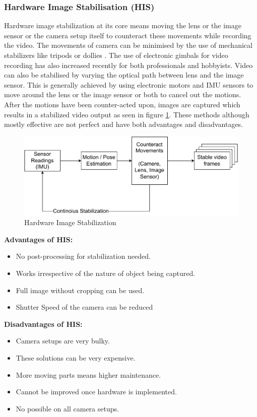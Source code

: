 \subsubsection{Hardware Image Stabilisation (HIS)}
Hardware image stabilization at its core means moving the lens or the image sensor or the camera setup itself to counteract these movements while recording the video. The movements of camera can be minimised by the use of mechanical stabilizers like tripods or dollies \citep{5995525}. The use of electronic gimbals for video recording has also increased recently for both professionals and hobbyists. Video can also be stabilised by varying the optical path between lens and the image sensor. This is generally achieved by using electronic motors and IMU sensors to move around the lens or the image sensor or both to cancel out the motions. After the motions have been counter-acted upon, images are captured which results in a stabilized video output as seen in figure \ref{fig:his}. These methods although mostly effective are not perfect and have both advantages and disadvantages.

\begin{figure}
\centering
\includegraphics[scale=0.6]{images/fig_chapter2/2_1_his.pdf}
\caption{Hardware Image Stabilization}
\label{fig:his}
\end{figure}

\textbf{Advantages of HIS: }

\begin{itemize}
\item No post-processing for stabilization needed.
\item Works irrespective of the nature of object being captured.
\item Full image without cropping can be used.
\item Shutter Speed of the camera can be reduced
\end{itemize}

\textbf{Disadvantages of HIS:}
\begin{itemize}
\item Camera setups are very bulky.
\item These solutions can be very expensive.
\item More moving parts means higher maintenance.
\item Cannot be improved once hardware is implemented.
\item No possible on all camera setups.
\end{itemize}

